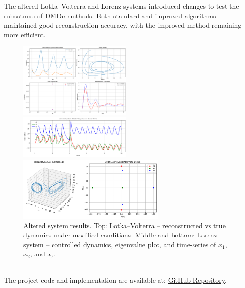 \documentclass[a4paper,12pt]{report}
\theoremstyle{definition}
\numberwithin{equation}{section}
\begin{document}
The altered Lotka–Volterra and Lorenz systems introduced changes to test the robustness of DMDc methods. Both standard and improved algorithms maintained good reconstruction accuracy, with the improved method remaining more efficient\cite{swaminathan2022}.
\begin{figure}[h!]
    \centering
    \includegraphics[width=0.5\textwidth]{Alter lv.png}
    
    \vspace{1em}
    
    \includegraphics[width=0.5\textwidth]{ALTER LODE.png}
    
    \vspace{1em}
    
    \includegraphics[width=0.65\textwidth]{ALTER L.png}
    
    \caption{Altered system results. Top: Lotka–Volterra – reconstructed vs true dynamics under modified conditions. Middle and bottom: Lorenz system – controlled dynamics, eigenvalue plot, and time-series of $x_1$, $x_2$, and $x_3$.}
\end{figure}\\
The project code and implementation are available at: 
\href{https://github.com/thexuanphuc/impoved_DMDC/tree/master}{GitHub Repository}.

\newpage
\renewcommand{\bibname}{References}
\begingroup
\small


\endgroup
\end{document}
